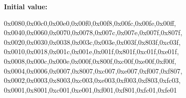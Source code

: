 \label{CONTIGSC_8C_a1c8053b1c5185cc1701015d26ca61eb0}
{\bfseries Initial value:}
\begin{DoxyCode}
 {
{0x0080,0x00c0,0x00e0,0x00f0,0x00f8,0x00fc,0x00fe,0x00ff},
{0x0040,0x0060,0x0070,0x0078,0x007c,0x007e,0x007f,0x807f},
{0x0020,0x0030,0x0038,0x003c,0x003e,0x003f,0x803f,0xc03f},
{0x0010,0x0018,0x001c,0x001e,0x001f,0x801f,0xc01f,0xe01f},
{0x0008,0x000c,0x000e,0x000f,0x800f,0xc00f,0xe00f,0xf00f},
{0x0004,0x0006,0x0007,0x8007,0xc007,0xe007,0xf007,0xf807},
{0x0002,0x0003,0x8003,0xc003,0xe003,0xf003,0xf803,0xfc03},
{0x0001,0x8001,0xc001,0xe001,0xf001,0xf801,0xfc01,0xfe01} }
\end{DoxyCode}
